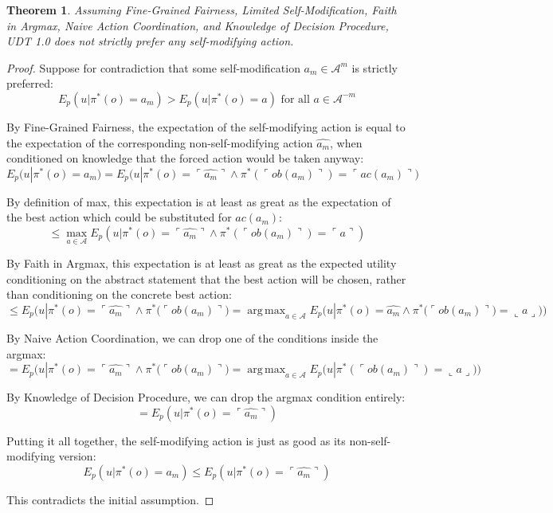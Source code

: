 \documentclass{article}
\newcommand{\qq}[1]{\ulcorner #1 \urcorner}
\newtheorem{theorem}{Theorem}
\DeclareMathOperator*{\argmax}{arg\,max}
\begin{document}
\begin{theorem}
Assuming Fine-Grained Fairness, Limited Self-Modification, Faith in Argmax, Naive Action Coordination, and Knowledge of Decision Procedure, UDT 1.0 does not strictly prefer any self-modifying action.
\end{theorem}

\begin{proof}
Suppose for contradiction that some self-modification $a_m \in \mathcal{A}^m$ is strictly preferred:
$$ E_p(u|\pi^*(o)=a_m) > E_p(u|\pi^*(o)=a) \text{ for all } a \in \mathcal{A}^{-m} $$

By Fine-Grained Fairness, the expectation of the self-modifying action is equal to the expectation of the corresponding non-self-modifying action $\hat{a_m}$, when conditioned on knowledge that the forced action would be taken anyway:
$$ E_p(u|\pi^*(o)=a_m) = E_p\big(u|\pi^*(o)=\qq{\hat {a_m}} \wedge \pi^*(\qq{ob(a_m)})=\qq{ac(a_m)}\big) $$

By definition of max, this expectation is at least as great as the expectation of the best action which could be substituted for $ac(a_m)$:
$$ \leq \max_{a \in \mathcal{A}} E_p(u|\pi^*(o)=\qq{\hat {a_m}} \wedge \pi^*(\qq{ob(a_m)})=\qq{a}) $$

By Faith in Argmax, this expectation is at least as great as the expected utility conditioning on the abstract statement that the best action will be chosen, rather than conditioning on the concrete best action:
$$ \leq E_p\Big(u|\pi^*(o)=\qq{\hat {a_m}} \wedge \pi^*\big(\qq{ob(a_m)}\big)= \argmax_{a \in \mathcal{A}} E_p\big(u|\pi^*(o)=\hat {a_m} \wedge \pi^*\big(\qq{ob ( a_m ) }\big)=\llcorner a\lrcorner \big)\Big) $$

By Naive Action Coordination, we can drop one of the conditions inside the argmax:
$$ = E_p \Big(u|\pi^*(o)=\qq{\hat {a_m}} \wedge \pi^*\big(\qq{ob(a_m)}\big)= \argmax_{a \in \mathcal{A}} E_p \big(u| \pi^*(\qq{ob(a_m)})=\llcorner a\lrcorner\big)\Big) $$

By Knowledge of Decision Procedure, we can drop the argmax condition entirely:
$$ = E_p(u|\pi^*(o)=\qq{\hat {a_m}}) $$

Putting it all together, the self-modifying action is just as good as its non-self-modifying version:
$$ E_p(u|\pi^*(o)=a_m) \leq E_p(u|\pi^*(o)=\qq{\hat {a_m}}) $$

This contradicts the initial assumption.
\end{proof}

\appendix
\end{document}
